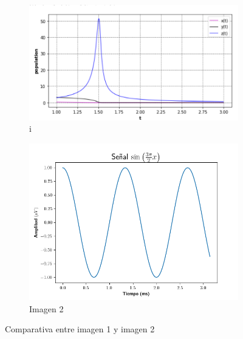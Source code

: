 \documentclass{wscpaperproc}
\theoremstyle{wsc}
\begin{document}
\begin{figure}[h]
  \centering
  \begin{subfigure}[b]{0.45\linewidth}
    \includegraphics[width=\linewidth]{Imagenes/Figure_1.png}
    \caption{i}
    \label{fig:imagen1}
  \end{subfigure}
  \hfill
  \begin{subfigure}[b]{0.45\linewidth}
    \includegraphics[width=\linewidth]{Imagenes/Figure_2.png}
    \caption{Imagen 2}
    \label{fig:imagen2}
  \end{subfigure}
  \caption{Comparativa entre imagen 1 y imagen 2}
  \label{fig:comparativa}
\end{figure}



\end{document}
